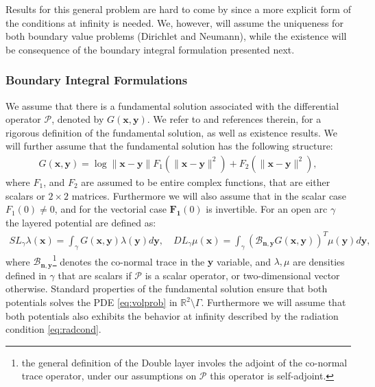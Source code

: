 \documentclass{article}
\newcommand{\vx}{\bm{x}}
\newcommand{\IR}{{\mathbb R}}
\newcommand{\cP}{\mathcal{P}}
\newcommand{\bn}{\bm{n}}
\newcommand{\bx}{\bm{x}}
\newcommand{\by}{\bm{y}}
\begin{document}
Results for this general problem are hard to come by since a more explicit form of the conditions at infinity is needed. We, however, will assume the uniqueness for both boundary value problems (Dirichlet and Neumann), while the existence will be consequence of the boundary integral formulation presented next. 
\subsubsection{Boundary Integral Formulations}
\label{sec:bif}
We assume that there is a fundamental solution associated with the differential operator $\cP$, denoted by $G(\vx,\by)$. We refer to \cite[Chapter 6]{mclean2000strongly} and references therein, for a rigorous definition of the fundamental solution, as well as existence results.
 We will further assume that the fundamental solution has the following structure:
\begin{align}
\label{eq:funsolgen}
G(\bx,\by )  =
\log \|\bx -\by \| F_1(\|\bx -\by \| ^2)+F_2(\|\bx -\by \| ^2),
\end{align}
where $F_1$, and $F_2$ are assumed to be entire complex functions, that are either scalars or $2 \times 2$ matrices. Furthermore we will also assume that in the scalar case $F_1(0) \neq 0$, and for the vectorial case $\mathbf{F_1}(0)$ is invertible. For an open arc $\gamma$ the layered potential are defined as:
\begin{align*}
SL_\gamma \lambda(\bx) = \int_\gamma G(\bx,\by) \lambda(\by) d\by, \quad DL_\gamma \mu(\bx) = \int_\gamma \left(\mathcal{B}_{\bn,\by} G(\bx,\by) \right)^T \mu(\by) d\by,
\end{align*} 
where $\mathcal{B}_{\bn,\by}$\footnote{the general definition of the Double layer involes the adjoint of the co-normal trace operator, under our assumptions on $\cP$ this operator is self-adjoint. } denotes the co-normal trace in the $\by$ variable, and $\lambda, \mu$ are densities defined in $\gamma$ that are scalars if $\cP$ is a scalar operator, or two-dimensional vector otherwise. Standard properties of the fundamental solution ensure that  both potentials solves the PDE \eqref{eq:volprob} in $\IR^2 \setminus \Gamma$. Furthermore we will assume that both potentials also exhibits the behavior at infinity described by the radiation condition \eqref{eq:radcond}. 
\end{document}
